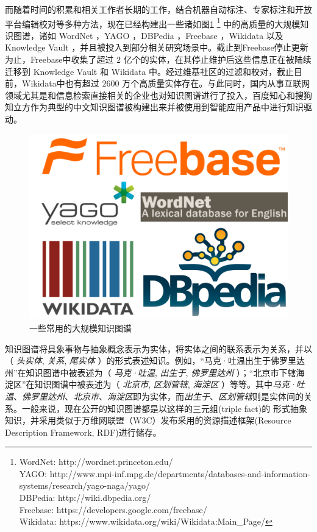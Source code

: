 而随着时间的积累和相关工作者长期的工作，结合机器自动标注、专家标注和开放平台编辑校对等多种方法，现在已经构建出一些诸如图\ref{ch1:KG_example}  \footnote{WordNet: http://wordnet.princeton.edu/ \\ YAGO: http://www.mpi-inf.mpg.de/departments/databases-and-information-systems/research/yago-naga/yago/ \\ DBPedia: http://wiki.dbpedia.org/ \\ Freebase: https://developers.google.com/freebase/ \\ Wikidata: https://www.wikidata.org/wiki/Wikidata:Main\_Page/} 中的高质量的大规模知识图谱，诸如 WordNet \cite{miller1995wordnet}，YAGO \cite{hoffart2013yago2}，DBPedia \cite{auer2007dbpedia}，Freebase \cite{bollacker2008freebase}，Wikidata \cite{vrandevcic2014wikidata} 以及 Knowledge Vault \cite{dong2014knowledge}，并且被投入到部分相关研究场景中。截止到Freebase停止更新为止，Freebase中收集了超过 $2$ 亿个的实体，在其停止维护后这些信息正在被陆续迁移到 Knowledge Vault 和 Wikidata 中。经过维基社区的过滤和校对，截止目前，Wikidata中也有超过 $2600$ 万个高质量实体存在。与此同时，国内从事互联网领域尤其是和信息检索直接相关的企业也对知识图谱进行了投入，百度知心和搜狗知立方作为典型的中文知识图谱被构建出来并被使用到智能应用产品中进行知识驱动。


\begin{figure}[!htbp]
\centering
\includegraphics[width=0.9\columnwidth]{figures/ch1/KG_example.png}
\caption{一些常用的大规模知识图谱\cite{bollacker2008freebase,auer2007dbpedia,hoffart2013yago2,miller1995wordnet,vrandevcic2014wikidata}}
\label{ch1:KG_example}
\end{figure}

知识图谱将具象事物与抽象概念表示为实体，将实体之间的联系表示为关系，并以（ \emph{头实体}, \emph{关系}, \emph{尾实体} ）的形式表述知识。例如，“马克·吐温出生于佛罗里达州”在知识图谱中被表述为（ \emph{马克·吐温}, \emph{出生于}, \emph{佛罗里达州} ）；“北京市下辖海淀区”在知识图谱中被表述为（ \emph{北京市}, \emph{区划管辖}, \emph{海淀区} ）等等。其中\emph{马克·吐温}、\emph{佛罗里达州}、\emph{北京市}、\emph{海淀区}即为实体，而\emph{出生于}、\emph{区划管辖}则是实体间的关系。一般来说，现在公开的知识图谱都是以这样的三元组(triple fact)的 形式抽象知识，并采用类似于万维网联盟（W3C）发布采用的资源描述框架(Resource Description Framework, RDF)进行储存。


